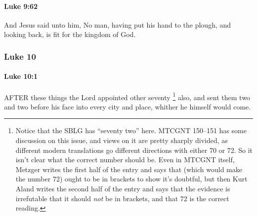 		\paragraph{Luke 9:62} %
			\label{LUKE-9-62}

			And Jesus said unto him, No man, having put his hand to the plough, and looking back, is fit for the kingdom of God.

			\begin{framed}
			\scriptsize
				\begin{compactdesc}
					\item[SBLG] 
				\end{compactdesc}
			\end{framed}

	\subsubsection{Luke 10} %
		\label{LUKE-10}
		
		\paragraph{Luke 10:1} %
			\label{LUKE-10-1}

			AFTER these things the Lord appointed other seventy%
				\footnote{%
					Notice that the SBLG has ``seventy two'' here. MTCGNT 150--151 has some discussion on this issue, and views on it are pretty sharply divided, as different modern translations go different directions with either 70 or 72. So it isn't clear what the correct number should be. Even in MTCGNT itself, Metzger writes the first half of the entry and says that  (which would make the number 72) ought to be in brackets to show it's doubtful, but then Kurt Aland writes the second half of the entry and says that the evidence is irrefutable that it should \textit{not} be in brackets, and that 72 is the correct reading.
					}
			also, and sent them two and two before his face into every city and place, whither he himself would come.

